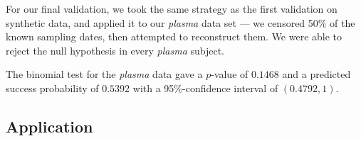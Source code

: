\documentclass[12pt]{article}
\begin{document}

For our final validation, we took the same strategy as the first validation on synthetic data, and applied it to our {\em plasma} data set --- we censored 50\% of the known sampling dates, then attempted to reconstruct them.
We were able to reject the null hypothesis in every {\em plasma} subject.

The {binomial test} for the \emph{plasma} data gave a $p$-value of $0.1468$ and a predicted success probability of $0.5392$ with a 95\%-confidence interval of $(0.4792, 1)$.

\subsection * {Application} \label{sec:mixed_data}

\end{document}
